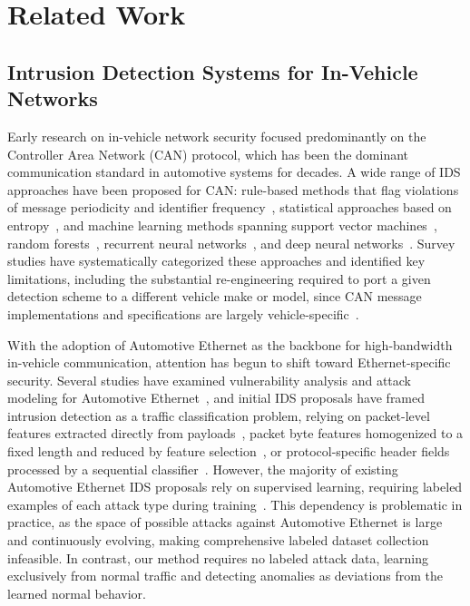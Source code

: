 \section{Related Work}
\label{sec:relatedwork}
\subsection{Intrusion Detection Systems for In-Vehicle Networks}
Early research on in-vehicle network security focused predominantly on the Controller Area Network (CAN) protocol, which has been the dominant communication standard in automotive systems for decades. A wide range of IDS approaches have been proposed for CAN: rule-based methods that flag violations of message periodicity and identifier frequency~\cite{song2016intrusion}, statistical approaches based on entropy~\cite{muter2011entropy}, and machine learning methods spanning support vector machines~\cite{bari2023intrusion}, random forests~\cite{caivano2024marea}, recurrent neural networks~\cite{taylor2016anomaly}, and deep neural networks~\cite{kang2016intrusion}. Survey studies have systematically categorized these approaches and identified key limitations, including the substantial re-engineering required to port a given detection scheme to a different vehicle make or model, since CAN message implementations and specifications are largely vehicle-specific~\cite{sharmin2024benchmarking, lampe2023survey}.

With the adoption of Automotive Ethernet as the backbone for high-bandwidth in-vehicle communication, attention has begun to shift toward Ethernet-specific security. Several studies have examined vulnerability analysis and attack modeling for Automotive Ethernet~\cite{de2024systematic, fotouhi2023assessing}, and initial IDS proposals have framed intrusion detection as a traffic classification problem, relying on packet-level features extracted directly from payloads~\cite{jeong2021convolutional}, packet byte features homogenized to a fixed length and reduced by feature selection~\cite{shibly2023feature}, or protocol-specific header fields processed by a sequential classifier~\cite{alkhatib2021some}. However, the majority of existing Automotive Ethernet IDS proposals rely on supervised learning, requiring labeled examples of each attack type during training~\cite{jeong2021convolutional,alkhatib2021some}. This dependency is problematic in practice, as the space of possible attacks against Automotive Ethernet is large and continuously evolving, making comprehensive labeled dataset collection infeasible. In contrast, our method requires no labeled attack data, learning exclusively from normal traffic and detecting anomalies as deviations from the learned normal behavior.

